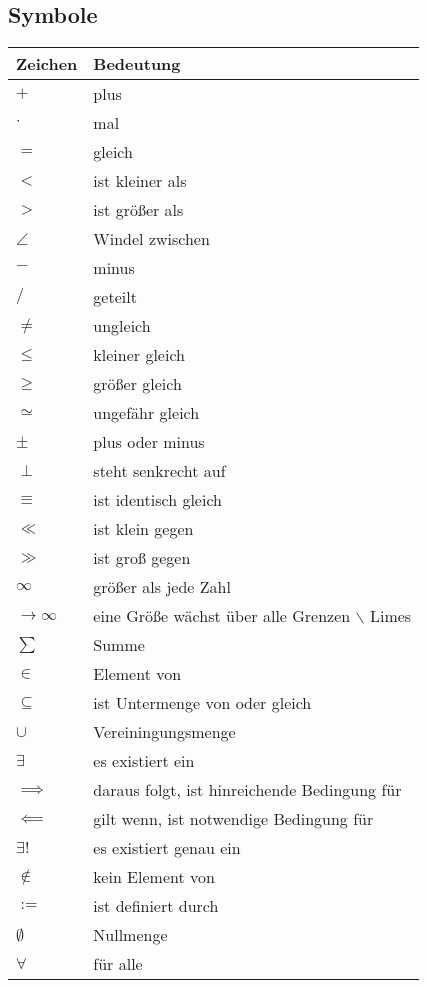 \documentclass[a4paper]{scrartcl}
\DeclareMathOperator{\Forall}{\forall}
\begin{document}
\subsection{Symbole}
\label{sec-2-1}
\begin{center}
\begin{tabular}{ll}
Zeichen & Bedeutung\\
\hline
$+$ & plus\\
$\cdot$ & mal\\
$=$ & gleich\\
$<$ & ist kleiner als\\
$>$ & ist größer als\\
$\angle$ & Windel zwischen\\
$-$ & minus\\
$/$ & geteilt\\
$\neq$ & ungleich\\
$\leq$ & kleiner gleich\\
$\geq$ & größer gleich\\
$\simeq$ & ungefähr gleich\\
$\pm$ & plus oder minus\\
$\perp$ & steht senkrecht auf\\
$\equiv$ & ist identisch gleich\\
$\ll$ & ist klein gegen\\
$\gg$ & ist groß gegen\\
$\infty$ & größer als jede Zahl\\
$\to \infty$ & eine Größe wächst über alle Grenzen $\backslash$ Limes\\
$\sum$ & Summe\\
$\in$ & Element von\\
$\subseteq$ & ist Untermenge von oder gleich\\
$\cup$ & Vereiningungsmenge\\
$\exists$ & es existiert ein\\
$\implies$ & daraus folgt, ist hinreichende Bedingung für\\
$\impliedby$ & gilt wenn, ist notwendige Bedingung für\\
$\exists!$ & es existiert genau ein\\
$\notin$ & kein Element von\\
$:=$ & ist definiert durch\\
$\emptyset$ & Nullmenge\\
$\Forall$ & für alle\\
\end{tabular}
\end{center}
\end{document}
